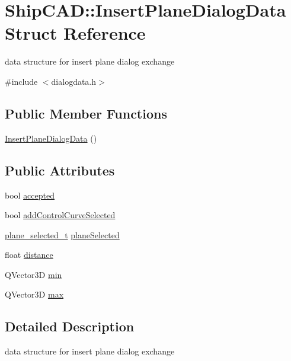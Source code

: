 \hypertarget{structShipCAD_1_1InsertPlaneDialogData}{}\section{Ship\+C\+AD\+:\+:Insert\+Plane\+Dialog\+Data Struct Reference}
\label{structShipCAD_1_1InsertPlaneDialogData}


data structure for insert plane dialog exchange  




{\ttfamily \#include $<$dialogdata.\+h$>$}

\subsection*{Public Member Functions}
\begin{DoxyCompactItemize}
\item 
\hyperlink{structShipCAD_1_1InsertPlaneDialogData_a413dd4a96e91adc9154a889cdad7c7fe}{Insert\+Plane\+Dialog\+Data} ()
\end{DoxyCompactItemize}
\subsection*{Public Attributes}
\begin{DoxyCompactItemize}
\item 
bool \hyperlink{structShipCAD_1_1InsertPlaneDialogData_a5b818074e9cca09e900e627fc9fc6e5c}{accepted}
\item 
bool \hyperlink{structShipCAD_1_1InsertPlaneDialogData_a930de438c156597564b6ae33dcea03c3}{add\+Control\+Curve\+Selected}
\item 
\hyperlink{namespaceShipCAD_aa0f3f220e102a298d2e698af90f5e1fc}{plane\+\_\+selected\+\_\+t} \hyperlink{structShipCAD_1_1InsertPlaneDialogData_aa028c61547384932261d4a8b647f9eeb}{plane\+Selected}
\item 
float \hyperlink{structShipCAD_1_1InsertPlaneDialogData_a73456e4622597dce48d16c05be358593}{distance}
\item 
Q\+Vector3D \hyperlink{structShipCAD_1_1InsertPlaneDialogData_a27431ce232112ee8c3c01cdc5eaba7fd}{min}
\item 
Q\+Vector3D \hyperlink{structShipCAD_1_1InsertPlaneDialogData_acef8dafcdd66649d8d0fa6fe6f8a7ea6}{max}
\end{DoxyCompactItemize}


\subsection{Detailed Description}
data structure for insert plane dialog exchange 

